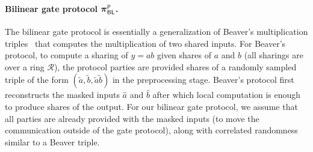 \paragraph{Bilinear gate protocol $\boldsymbol{\pi}_{\textsf{BL}}^p$.}
The bilinear gate protocol is essentially a generalization of Beaver's multiplication triples~\cite{boyle2019-fss-preprocess,beaver1991-triples} that computes the multiplication of two shared inputs. For Beaver's protocol, to compute a sharing of $y = ab$ given shares of $a$ and $b$ (all sharings are over a ring $\mathcal{R}$), the protocol parties are provided shares of a randomly sampled triple of the form $(\tilde{a},\tilde{b},\tilde{a}\tilde{b})$ in the preprocessing stage. Beaver's protocol first reconstructs the masked inputs $\hat{a}$ and $\hat{b}$ after which local computation is enough to produce shares of the output. For our bilinear gate protocol, we assume that  all parties are already provided with the masked inputs (to move the communication outside of the gate protocol), along with correlated randomness similar to a Beaver triple. 

